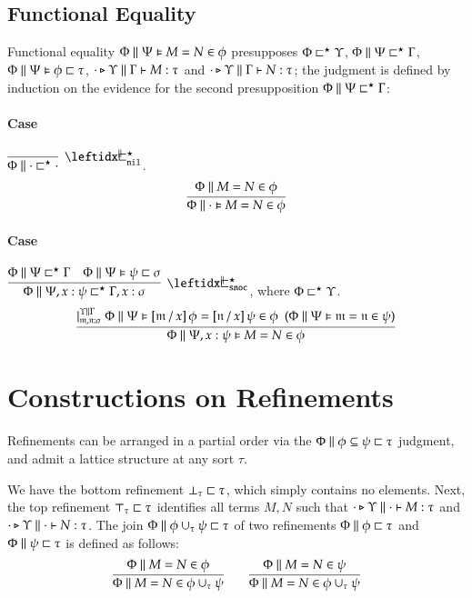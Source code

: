 \documentclass[11pt]{article}
\theoremstyle{definition}
\theoremstyle{remark}
\numberwithin{equation}{section}
\def\IModeColorName{MidnightBlue}
\def\OModeColorName{Maroon}
\def\IModeColorName{Black}
\def\OModeColorName{Black}
\newcommand\IMode[1]{{\color{\IModeColorName}{#1}}}
\newcommand\OMode[1]{{\color{\OModeColorName}{#1}}}
\newcommand\HypJ[2]{#1\ \ (#2)}
\newcommand\HPGenJ[4]{\vert^{\IMode{#1}\parallel\IMode{#2}}_{\IMode{#3}}\; #4}
\newcommand\IsAbtUnmoded[5]{
  #1\triangleright%
  #2\parallel%
  #3\vdash%
  #4:\OMode{#5}%
}
\newcommand\IsAbt[5]{\IsAbtUnmoded{\IMode{#1}}{\IMode{#2}}{\IMode{#3}}{\IMode{#4}}{\OMode{#5}}}
\newcommand\MV[1]{\mathfrak{#1}}
\newcommand\Subst[3]{%
  \left[#1\, /\, #2\right]#3%
}
\newcommand\Refines[3]{\IMode{#1}\parallel\IMode{#2}\sqsubset\OMode{#3}}
\newcommand\GRefines[2]{\IMode{#1}\sqsubset\OMode{#2}}
\newcommand\RefinesCtx[2]{\IMode{#1}\sqsubset^\star\OMode{#2}}
\newcommand\HRefines[4]{\IMode{#1}\parallel\IMode{#2}\vDash\IMode{#3}\sqsubset\OMode{#4}}
\newcommand\PRefinesCtx[3]{\IMode{#1}\parallel\IMode{#2}\sqsubset^\star\OMode{#3}}
\newcommand\RMemEq[4]{\IMode{#1}\parallel\IMode{#2}=\IMode{#3}\in\IMode{#4}}
\newcommand\HRMemEq[5]{\IMode{#1}\parallel\IMode{#2}\vDash\IMode{#3}=\IMode{#4}\in\IMode{#5}}
\newcommand\SubRefines[4]{\IMode{#1}\parallel\IMode{#2}\subseteq\IMode{#3}\sqsubset\OMode{#4}}
\newcommand\TyTop[1]{\top_{#1}}
\newcommand\TyBot[1]{\bot_{#1}}
\newcommand\TyJoin[1]{\cup_{#1}}
\begin{document}
\subsection{Functional Equality}

Functional equality $\HRMemEq{\Phi}{\Psi}{M}{N}{\phi}$ presupposes
$\RefinesCtx{\Phi}{\Upsilon}$, $\PRefinesCtx{\Phi}{\Psi}{\Gamma}$,
$\HRefines{\Phi}{\Psi}{\phi}{\tau}$, $\IsAbt{\cdot}{\Upsilon}{\Gamma}{M}{\tau}$
and $\IsAbt{\cdot}{\Upsilon}{\Gamma}{N}{\tau}$; the judgment is defined by
induction on the evidence for the second presupposition
$\PRefinesCtx{\Phi}{\Psi}{\Gamma}$:

\paragraph{Case} $\DefPRefinesCtxNil{\Phi}$.
\[
  \infer{
    \HRMemEq{\Phi}{\cdot}{M}{N}{\phi}
  }{
    \RMemEq{\Phi}{M}{N}{\phi}
  }
\]

\paragraph{Case} $\DefPRefinesCtxSnoc{\Phi}{\Psi}{x}{\psi}{\Gamma}{\sigma}$,
where $\RefinesCtx{\Phi}{\Upsilon}$.
\[
  \infer{
    \HRMemEq{\Phi}{\Psi,x:\psi}{M}{N}{\phi}
  }{
    \HPGenJ{\Upsilon}{\Gamma}{\MV{m},\MV{n}:\sigma}{
      \HypJ{
        \HRMemEq{\Phi}{\Psi}{
          \Subst{\MV{m}}{x}{\phi}
        }{
          \Subst{\MV{n}}{x}{\psi}
        }{\phi}
      }{
        \HRMemEq{\Phi}{\Psi}{\MV{m}}{\MV{n}}{\psi}
      }
    }
  }
\]

\section{Constructions on Refinements}

Refinements can be arranged in a partial order via the
$\SubRefines{\Phi}{\phi}{\psi}{\tau}$ judgment, and admit a lattice structure
at any sort $\tau$.

We have the bottom refinement $\GRefines{\TyBot{\tau}}{\tau}$, which simply
contains no elements. Next, the top refinement $\GRefines{\TyTop{\tau}}{\tau}$
identifies all terms $M,N$ such that $\IsAbt{\cdot}{\Upsilon}{\cdot}{M}{\tau}$
and $\IsAbt{\cdot}{\Upsilon}{\cdot}{N}{\tau}$. The join
$\Refines{\Phi}{\phi\TyJoin{\tau}\psi}{\tau}$ of two refinements
$\Refines{\Phi}{\phi}{\tau}$ and $\Refines{\Phi}{\psi}{\tau}$ is defined as follows:
\begin{gather*}
  \infer{
    \RMemEq{\Phi}{M}{N}{\phi\TyJoin{\tau}\psi}
  }{
    \RMemEq{\Phi}{M}{N}{\phi}
  }\qquad
  \infer{
    \RMemEq{\Phi}{M}{N}{\phi\TyJoin{\tau}\psi}
  }{
    \RMemEq{\Phi}{M}{N}{\psi}
  }
\end{gather*}
\end{document}
